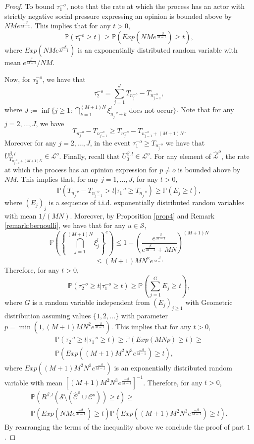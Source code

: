 \documentclass[11pt]{article}
\theoremstyle{definition}
\newcommand{\st}{\mathcal{S}}
\def\P{{\mathbb P}}
\begin{document}
\begin{proof}
    To bound $\tau^{-o}_1$, note that the rate at which the process has an actor with strictly negative social pressure expressing an opinion is bounded above by $NMe^{\frac{-\beta}{M-1}}$. 
    This implies that for any $t>0$,
$$
        \mathbb{P}(\tau^{-o}_1\geq t)\geq \mathbb{P}(Exp(NMe^{\frac{-\beta}{M-1}})\geq t),
    $$
where $Exp(NMe^{\frac{-\beta}{M-1}})$ is an exponentially distributed random variable with mean $e^{\frac{\beta}{M-1}}/NM$. 
    
Now, for $\tau^{-o}_2$, we have that
$$
\tau^{-o}_2=\sum^J_{j=1}T_{n^{-o}_j}-T_{n^{-o}_{j-1}},
$$
where $J:=\inf\{j\geq 1: \bigcap_{k=1}^{(M+1)N}\xi_{n_{j}^{-o}+k}^{l} \text{ does not occur}\}$. Note that for any $j=2,\ldots,J$, we have
$$
T_{n^{-o}_j}-T_{n^{-o}_{j-1}}\geq T_{n^{-o}_j}-T_{n^{-o}_{j-1}+(M+1)N}.
$$
Moreover for any $j= 2, \ldots, J$, in the event $\tau^{-o}_1\geq T_{n^{-o}_j}$ we have that $U_{T_{n^{-o}_{j-1}+(M+1)N}}^{\beta, l} \in \mathcal{L}^o$. Finally, recall that $U_0^{\beta,l} \in  \mathcal{L}^o$.
For any element of $\hat{\mathcal{L}}^o$, the rate at which the process has an opinion expression for $p\neq o$ is bounded above by $NM$. This implies that, for any $j =1,\ldots,J$, for any $t > 0$,
$$
        \mathbb{P}(T_{n^{-o}_j}-T_{n^{-o}_{j-1}} >t|\tau^{-o}_1\geq T_{n^{-o}_j})\geq\mathbb{P}\left(E_j\geq t \right),
$$
where $(E_j)_j$ is a sequence of i.i.d. exponentially distributed random variables with mean $1/(MN)$. Moreover, by Proposition \ref{prop4} and Remark \ref{remark:bernoulli}, we have that for any $u\in \st$,
$$
\P\left(\left\{\bigcap_{j=1}^{(M+1)N}\xi^{l}_j\right\}^c\right)\leq1-\left(\frac{e^{\frac{\beta}{M-1}}}{e^{\frac{\beta}{M-1}}+MN}\right)^{(M+1)N}
$$
$$
\leq  (M+1)MN^2e^{\frac{-\beta}{M-1}}
$$
Therefore, for any $t>0$,
$$
        \mathbb{P}(\tau^{-o}_2\geq t|\tau^{-o}_1\geq t)\geq\mathbb{P}\left(\sum^{G}_{j=1}E_j\geq t \right),
    $$
where $G$ is a random variable independent from $(E_j)_{j\geq1}$ with Geometric distribution assuming values $\{1,2,...\}$ with parameter $p=\min(1,(M+1)MN^2e^{\frac{-\beta}{M-1}})$. This implies that for any $t>0$,
\begin{multline*}
\mathbb{P}(\tau^{-o}_2\geq t|\tau^{-o}_1\geq t)\geq 
          \mathbb{P}(Exp(MNp)\geq t) \geq \\
        \mathbb{P}(Exp((M+1)M^2N^3e^{\frac{-\beta}{M-1}})\geq t),
\end{multline*}
    where $Exp((M+1)M^2N^3e^{\frac{-\beta}{M-1}})$ is an exponentially distributed random variable with mean $[(M+1)M^2N^3e^{\frac{-\beta}{M-1}}]^{-1}$. Therefore, for any $t>0$,
\begin{multline*}
\mathbb{P}(R^{\beta,l}(\mathcal{S}\setminus(\hat{\mathcal{C}}^o\cup \mathcal{C}^o))\geq t)\geq\\\mathbb{P}(Exp(NMe^{\frac{-\beta}{M-1}})\geq t)\mathbb{P}(Exp((M+1)M^2N^3e^{\frac{-\beta}{M-1}})\geq t).
\end{multline*}
By rearranging the terms of the inequality above we conclude the proof of part $1$.


\end{proof}
\end{document}
